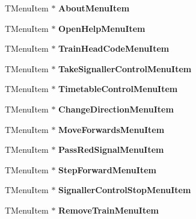 \begin{DoxyCompactItemize}
\item 
\mbox{\label{class_t_interface_a8b725a9474aad77174fdf8e44b285b98}} 
T\+Menu\+Item $\ast$ {\bfseries About\+Menu\+Item}
\item 
\mbox{\label{class_t_interface_a6cdce7bb8a495891ca9aebdec811eea7}} 
T\+Menu\+Item $\ast$ {\bfseries Open\+Help\+Menu\+Item}
\item 
\mbox{\label{class_t_interface_a4f47c7fbc5c7fed553660681e9a9db13}} 
T\+Menu\+Item $\ast$ {\bfseries Train\+Head\+Code\+Menu\+Item}
\item 
\mbox{\label{class_t_interface_aba33f688c4d29b90e6199ebbc3ec915a}} 
T\+Menu\+Item $\ast$ {\bfseries Take\+Signaller\+Control\+Menu\+Item}
\item 
\mbox{\label{class_t_interface_a98a1985536936cdcc54066e7c9c51752}} 
T\+Menu\+Item $\ast$ {\bfseries Timetable\+Control\+Menu\+Item}
\item 
\mbox{\label{class_t_interface_a33602d7a6ab6abd00ef298f9e43c7ed1}} 
T\+Menu\+Item $\ast$ {\bfseries Change\+Direction\+Menu\+Item}
\item 
\mbox{\label{class_t_interface_aec930273d5d2aef93eda66a890856846}} 
T\+Menu\+Item $\ast$ {\bfseries Move\+Forwards\+Menu\+Item}
\item 
\mbox{\label{class_t_interface_ad807d344c8793fa5440e5f0d1e2eeed6}} 
T\+Menu\+Item $\ast$ {\bfseries Pass\+Red\+Signal\+Menu\+Item}
\item 
\mbox{\label{class_t_interface_a1334c491f0254679207838eb0f457bd5}} 
T\+Menu\+Item $\ast$ {\bfseries Step\+Forward\+Menu\+Item}
\item 
\mbox{\label{class_t_interface_ad296d1d02641e6ab1c736a5feefc0aea}} 
T\+Menu\+Item $\ast$ {\bfseries Signaller\+Control\+Stop\+Menu\+Item}
\item 
\mbox{\label{class_t_interface_a5471ec6f1a7b0b956c9faa1c6c30b672}} 
T\+Menu\+Item $\ast$ {\bfseries Remove\+Train\+Menu\+Item}

\end{DoxyCompactItemize}
